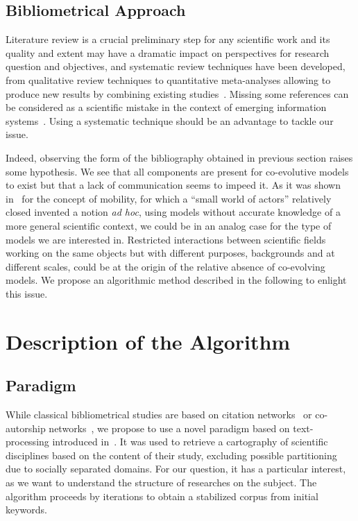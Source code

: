 \subsection{Bibliometrical Approach}

Literature review is a crucial preliminary step for any scientific work and its quality and extent may have a dramatic impact on perspectives for research question and objectives, and systematic review techniques have been developed, from qualitative review techniques to quantitative meta-analyses allowing to produce new results by combining existing studies~\cite{rucker2012network}. Missing some references can be considered as a scientific mistake in the context of emerging information systems~\cite{lissacksubliminal}. Using a systematic technique should be an advantage to tackle our issue.

Indeed, observing the form of the bibliography obtained in previous section raises some hypothesis. We see that all components are present for co-evolutive models to exist but that a lack of communication seems to impeed it. As it was shown in~\cite{commenges:tel-00923682} for the concept of mobility, for which a ``small world of actors'' relatively closed invented a notion \emph{ad hoc}, using models without accurate knowledge of a more general scientific context, we could be in an analog case for the type of models we are interested in. Restricted interactions between scientific fields working on the same objects but with different purposes, backgrounds and at different scales, could be at the origin of the relative absence of co-evolving models. We propose an algorithmic method described in the following to enlight this issue.


\section{Description of the Algorithm}

\subsection{Paradigm}

While classical bibliometrical studies are based on citation networks~\cite{2013arXiv1310.8220N} or co-autorship networks~\cite{2014arXiv1402.7268S}, we propose to use a novel paradigm based on text-processing introduced in~\cite{chavalarias2013phylomemetic}. It was used to retrieve a cartography of scientific disciplines based on the content of their study, excluding possible partitioning due to socially separated domains. For our question, it has a particular interest, as we want to understand the structure of researches on the subject. The algorithm proceeds by iterations to obtain a stabilized corpus from initial keywords.

